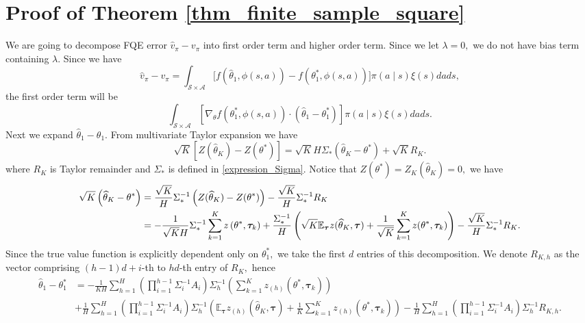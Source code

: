 \documentclass{article}
\numberwithin{equation}{section}
\theoremstyle{plain}
\theoremstyle{definition}
\theoremstyle{remark}
\begin{document}
\section{Proof of Theorem \ref{thm_finite_sample_square}}
We are going to decompose FQE error $\widehat{v}_{\pi} - v_{\pi}$ into first order term and higher order term. Since we let $\lambda = 0,$ we do not have bias term containing $\lambda.$ Since we have
\begin{equation*}
    \widehat{v}_{\pi} - v_{\pi} = \int_{\mathcal{S} \times \mathcal{A}} \Bigg[f(\widehat{\theta}_1,\phi(s,a)) - f(\theta_1^*,\phi(s,a))\Bigg]\pi(a \mid s)\xi(s) d a d s,
\end{equation*}
the first order term will be
$$
\int_{\mathcal{S} \times \mathcal{A}} \left[\nabla_{\theta} f(\theta_1^*,\phi(s,a)) \cdot \left(\widehat{\theta}_1 - \theta_1^*\right)\right] \pi(a \mid s)\xi(s) d a d s.
$$
Next we expand $\widehat{\theta}_1 - \theta_1.$ From multivariate Taylor expansion we have 
\begin{equation}\label{finite_Taylor}
    \sqrt{K} \left[Z(\widehat{\theta}_K) - Z(\theta^*)\right] = \sqrt{K} H \Sigma_* (\widehat{\theta}_K - \theta^*) + \sqrt{K} R_K.
\end{equation}
where $R_K$ is Taylor remainder and $\Sigma_*$ is defined in \eqref{expression_Sigma}. Notice that $Z(\theta^*) = Z_K(\widehat{\theta}_K) = 0,$ we have
\begin{align}
    \sqrt{K}\left(\widehat{\theta}_K - \theta^*\right)
    &= \frac{\sqrt{K}}{H} \Sigma^{-1}_* \left(Z(\widehat{\theta}_K) - Z(\theta^*)\right) - \frac{\sqrt{K}}{H} \Sigma^{-1}_* R_K \notag \\
    &= -\frac{1}{\sqrt{K}H} \Sigma^{-1}_* \sum_{k=1}^K z\left(\theta^*,\boldsymbol{\tau}_k\right) + \frac{\Sigma^{-1}_*}{H} \left(\sqrt{K}\mathbb{E}_{\boldsymbol{\tau}} z(\widehat{\theta}_K, \boldsymbol{\tau}) + \frac{1}{\sqrt{K}} \sum_{k=1}^K z(\theta^*,\boldsymbol{\tau}_k) \right) - \frac{\sqrt{K}}{H} \Sigma^{-1}_* R_K. \label{decomposition}
\end{align}
Since the true value function is explicitly dependent only on $\theta_1^*,$ we take the first $d$ entries of this decomposition. We denote $R_{K,h}$ as the vector comprising $(h-1)d + i$-th to $hd$-th entry of $R_K,$ hence
\begin{align*}
    \widehat{\theta}_1 - \theta_1^* 
    & = -\frac{1}{KH} \sum_{h=1}^H \left(\prod_{i=1}^{h-1} \Sigma_{i}^{-1} A_i\right) \Sigma^{-1}_h \left(\sum_{k=1}^K z_{(h)}(\theta^*,\boldsymbol{\tau}_k)\right) \\
    & + \frac{1}{H}\sum_{h=1}^H \left(\prod_{i=1}^{h-1} \Sigma_{i}^{-1} A_i\right) \Sigma^{-1}_h \left(\mathbb{E}_{\boldsymbol{\tau}} z_{(h)}(\widehat{\theta}_K,\boldsymbol{\tau}) + \frac{1}{K} \sum_{k=1}^K z_{(h)}(\theta^*,\boldsymbol{\tau}_k)\right) - \frac{1}{H} \sum_{h=1}^H \left(\prod_{i=1}^{h-1} \Sigma_{i}^{-1} A_i\right) \Sigma^{-1}_h R_{K,h}.
\end{align*}
\end{document}
